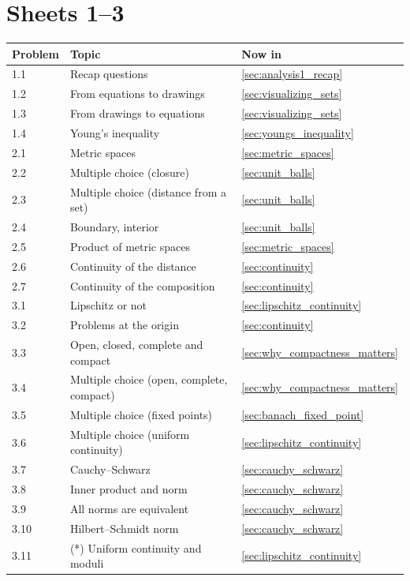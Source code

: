 \section{Sheets 1--3}
\label{sec:sheet_index_1_3}

\begin{center}
\begin{tabular}{@{}l l l@{}}
\textbf{Problem} & \textbf{Topic} & \textbf{Now in} \\
\hline
1.1 & Recap questions          & \cref{sec:analysis1_recap} \\
1.2 & From equations to drawings & \cref{sec:visualizing_sets} \\
1.3 & From drawings to equations & \cref{sec:visualizing_sets} \\
1.4 & Young's inequality       & \cref{sec:youngs_inequality} \\[4pt]
2.1 & Metric spaces            & \cref{sec:metric_spaces} \\
2.2 & Multiple choice (closure) & \cref{sec:unit_balls} \\
2.3 & Multiple choice (distance from a set) & \cref{sec:unit_balls} \\
2.4 & Boundary, interior       & \cref{sec:unit_balls} \\
2.5 & Product of metric spaces & \cref{sec:metric_spaces} \\
2.6 & Continuity of the distance & \cref{sec:continuity} \\
2.7 & Continuity of the composition & \cref{sec:continuity} \\[4pt]
3.1 & Lipschitz or not         & \cref{sec:lipschitz_continuity} \\
3.2 & Problems at the origin   & \cref{sec:continuity} \\
3.3 & Open, closed, complete and compact & \cref{sec:why_compactness_matters} \\
3.4 & Multiple choice (open, complete, compact) & \cref{sec:why_compactness_matters} \\
3.5 & Multiple choice (fixed points) & \cref{sec:banach_fixed_point} \\
3.6 & Multiple choice (uniform continuity) & \cref{sec:lipschitz_continuity} \\
3.7 & Cauchy--Schwarz          & \cref{sec:cauchy_schwarz} \\
3.8 & Inner product and norm   & \cref{sec:cauchy_schwarz} \\
3.9 & All norms are equivalent & \cref{sec:cauchy_schwarz} \\
3.10 & Hilbert--Schmidt norm   & \cref{sec:cauchy_schwarz} \\
3.11 & (*) Uniform continuity and moduli & \cref{sec:lipschitz_continuity} \\
\end{tabular}
\end{center}

